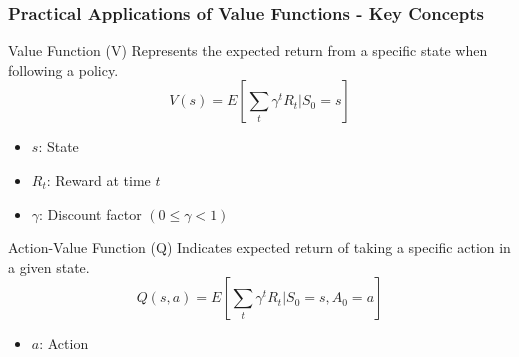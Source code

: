 \documentclass[aspectratio=169]{beamer}
\begin{document}
\begin{frame}[fragile]
  \frametitle{Practical Applications of Value Functions - Key Concepts}
  
  \begin{block}{Value Function (V)}
    Represents the expected return from a specific state when following a policy.
    \begin{equation}
      V(s) = E\left[\sum_{t} \gamma^t R_t | S_0 = s\right]
    \end{equation}
    \begin{itemize}
      \item \(s\): State
      \item \(R_t\): Reward at time \(t\)
      \item \(\gamma\): Discount factor \((0 \leq \gamma < 1)\)
    \end{itemize}
  \end{block}
  
  \begin{block}{Action-Value Function (Q)}
    Indicates expected return of taking a specific action in a given state.
    \begin{equation}
      Q(s, a) = E\left[\sum_{t} \gamma^t R_t | S_0 = s, A_0 = a\right]
    \end{equation}
    \begin{itemize}
      \item \(a\): Action
    \end{itemize}
  \end{block}
\end{frame}
\end{document}
